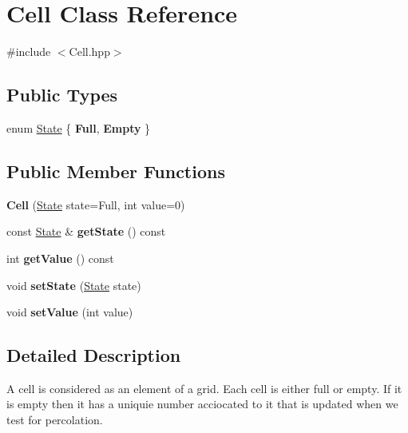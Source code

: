 \hypertarget{class_cell}{}\section{Cell Class Reference}
\label{class_cell}


{\ttfamily \#include $<$Cell.\+hpp$>$}

\subsection*{Public Types}
\begin{DoxyCompactItemize}
\item 
enum \hyperlink{class_cell_a21d74a2efcb79c93e5649b06a50b7cf5}{State} \{ {\bfseries Full}, 
{\bfseries Empty}
 \}
\end{DoxyCompactItemize}
\subsection*{Public Member Functions}
\begin{DoxyCompactItemize}
\item 
\mbox{\label{class_cell_a863f7e7c3721ae17caa74eb8f68e6b82}} 
{\bfseries Cell} (\hyperlink{class_cell_a21d74a2efcb79c93e5649b06a50b7cf5}{State} state=Full, int value=0)
\item 
\mbox{\label{class_cell_a9d4d744e2f7405eab6259b564dd37908}} 
const \hyperlink{class_cell_a21d74a2efcb79c93e5649b06a50b7cf5}{State} \& {\bfseries get\+State} () const
\item 
\mbox{\label{class_cell_a09df2b33dfc3866456d076c37723a4c4}} 
int {\bfseries get\+Value} () const
\item 
\mbox{\label{class_cell_a927a3e5932063a24c00a750dddf66443}} 
void {\bfseries set\+State} (\hyperlink{class_cell_a21d74a2efcb79c93e5649b06a50b7cf5}{State} state)
\item 
\mbox{\label{class_cell_a9b58034e57c99329a534189428882e0e}} 
void {\bfseries set\+Value} (int value)
\end{DoxyCompactItemize}


\subsection{Detailed Description}
A cell is considered as an element of a grid. Each cell is either full or empty. If it is empty then it has a uniquie number acciocated to it that is updated when we test for percolation. 

